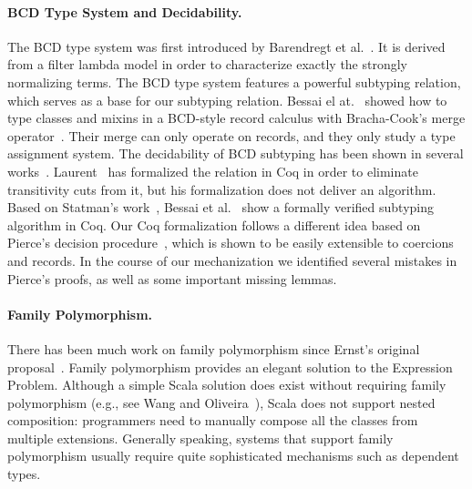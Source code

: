 

\paragraph{BCD Type System and Decidability.}
The BCD type system was first introduced by Barendregt et al.~\cite{Barendregt_1983}. It is
derived from a filter lambda model in order to characterize exactly the strongly
normalizing terms. The BCD type system features a powerful subtyping relation,
which serves as a base for our subtyping relation. Bessai el at.~\cite{DBLP:journals/corr/BessaiDDCd15}
showed how to type classes and mixins in a BCD-style record calculus with Bracha-Cook's merge operator~\cite{bracha1990mixin}.
Their merge can only operate on records, and they only study a type assignment system.
The decidability of BCD subtyping has been shown in several
works~\cite{pierce1989decision, Kurata_1995, Rehof_2011, Statman_2015}.
Laurent~\cite{laurent2012intersection} has formalized the relation in Coq in
order to eliminate transitivity cuts from it, but his formalization does not
deliver an algorithm. Based on Statman's work~\cite{Statman_2015}, Bessai et
al.~\cite{bessaiextracting} show a formally verified subtyping algorithm in Coq.
Our Coq formalization follows a different idea based on Pierce's decision
procedure~\cite{pierce1989decision}, which is shown to be easily extensible to
coercions and records. In the course of our mechanization we identified several
mistakes in Pierce's proofs, as well as some important missing lemmas.

\paragraph{Family Polymorphism.}
There has been much work on family polymorphism since Ernst's
original proposal~\cite{Ernst_2001}. Family polymorphism provides an elegant
solution to the Expression Problem. Although a simple Scala solution does exist without
requiring family polymorphism (e.g., see Wang and Oliveira~\cite{wang2016expression}), Scala
does not support nested composition: programmers need to manually compose
all the classes from multiple extensions. Generally speaking, systems that support
family polymorphism usually require quite sophisticated mechanisms such as
dependent types.

